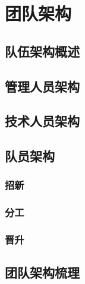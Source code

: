 \section{团队架构}

    \subsection{队伍架构概述}
    
        \noindent
    
    \subsection{管理人员架构}

    \subsection{技术人员架构}
    
    \subsection{队员架构}
    
        \subsubsection{招新}

        \subsubsection{分工}

        \subsubsection{晋升}

    \subsection{团队架构梳理}
    